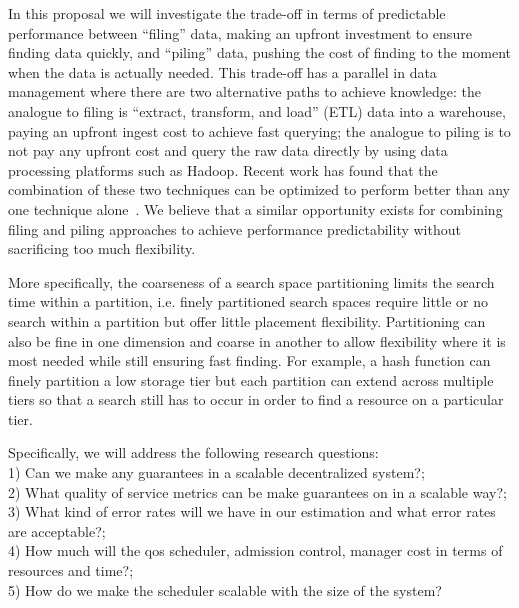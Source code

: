 In this proposal we will investigate the trade-off in terms of predictable performance between ``filing'' data, making an upfront investment to ensure finding data quickly, and ``piling'' data, pushing the cost of finding to the moment when the data is actually needed. This trade-off has a parallel in data management where there are two alternative paths to achieve knowledge: the analogue to filing is ``extract, transform, and load'' (ETL) data into a warehouse, paying an upfront ingest cost to achieve fast querying; the analogue to piling is to not pay any upfront cost and query the raw data directly by using data processing platforms such as Hadoop. Recent work has found that the combination of these two techniques can be optimized to perform better than any one technique alone~\cite{lefevre:sigmod14a}. We believe that a similar opportunity exists for combining filing and piling approaches to achieve performance predictability without sacrificing too much flexibility.

More specifically, the coarseness of a search space partitioning limits the search time within a partition, i.e. finely partitioned search spaces require little or no search within a partition but offer little placement flexibility. Partitioning can also be fine in one dimension and coarse in another to allow flexibility where it is most needed while still ensuring fast finding. For example, a hash function can finely partition a low storage tier but each partition can extend across multiple tiers so that a search still has to occur in order to find a resource on a particular tier. 

Specifically, we will address the following research questions:\\
  1) Can we make any guarantees in a scalable decentralized system?; \\
  2) What quality of service metrics can be make guarantees on in a scalable
    way?;\\
  3) What kind of error rates will we have in our estimation and what error
    rates are acceptable?;\\
  4) How much will the qos scheduler, admission control, manager cost in
    terms of resources and time?;\\
  5) How do we make the scheduler scalable with the size of the system?


